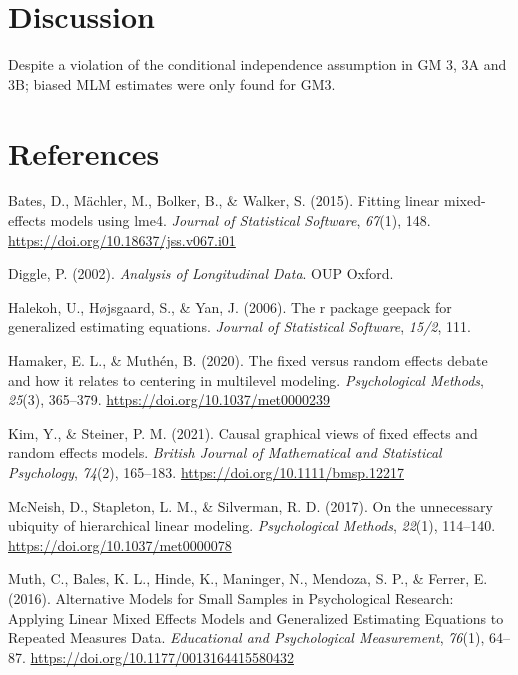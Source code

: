 \documentclass[
  12pt,
  a4paper,
]{article}
\newlength{\cslhangindent}
\newenvironment{CSLReferences}[2] %
 {\begin{list}{}{%
  \setlength{\itemindent}{0pt}
  \setlength{\leftmargin}{0pt}
  \setlength{\parsep}{0pt}
  \ifodd #1
   \setlength{\leftmargin}{\cslhangindent}
   \setlength{\itemindent}{-1\cslhangindent}
  \fi
  \setlength{\itemsep}{#2\baselineskip}}}
 {\end{list}}
\begin{document}
\section{Discussion}\label{discussion}

Despite a violation of the conditional independence assumption in GM 3,
3A and 3B; biased MLM estimates were only found for GM3.

\newpage

\section{References}\label{references}

\label{refs}
\begin{CSLReferences}{1}{0}
Bates, D., Mächler, M., Bolker, B., \& Walker, S. (2015). Fitting linear
mixed-effects models using {lme4}. \emph{Journal of Statistical
Software}, \emph{67}(1), 148.
\url{https://doi.org/10.18637/jss.v067.i01}

Diggle, P. (2002). \emph{Analysis of Longitudinal Data}. OUP Oxford.

Halekoh, U., Højsgaard, S., \& Yan, J. (2006). The r package geepack for
generalized estimating equations. \emph{Journal of Statistical
Software}, \emph{15/2}, 111.

Hamaker, E. L., \& Muthén, B. (2020). The fixed versus random effects
debate and how it relates to centering in multilevel modeling.
\emph{Psychological Methods}, \emph{25}(3), 365--379.
\url{https://doi.org/10.1037/met0000239}

Kim, Y., \& Steiner, P. M. (2021). Causal graphical views of fixed
effects and random effects models. \emph{British Journal of Mathematical
and Statistical Psychology}, \emph{74}(2), 165--183.
\url{https://doi.org/10.1111/bmsp.12217}

McNeish, D., Stapleton, L. M., \& Silverman, R. D. (2017). On the
unnecessary ubiquity of hierarchical linear modeling.
\emph{Psychological Methods}, \emph{22}(1), 114--140.
\url{https://doi.org/10.1037/met0000078}

Muth, C., Bales, K. L., Hinde, K., Maninger, N., Mendoza, S. P., \&
Ferrer, E. (2016). Alternative Models for Small Samples in Psychological
Research: Applying Linear Mixed Effects Models and Generalized
Estimating Equations to Repeated Measures Data. \emph{Educational and
Psychological Measurement}, \emph{76}(1), 64--87.
\url{https://doi.org/10.1177/0013164415580432}


\end{CSLReferences}
\end{document}
